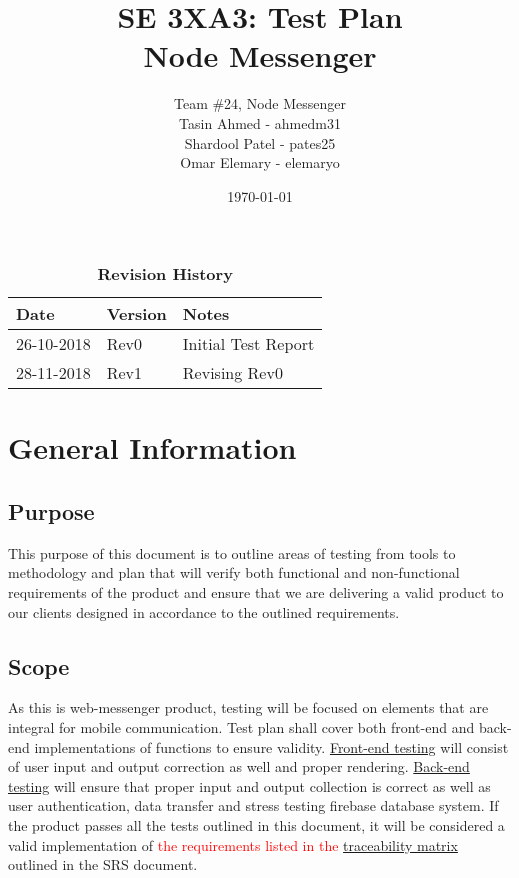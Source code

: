 \documentclass[12pt, titlepage]{article}
\title{SE 3XA3: Test Plan\\Node Messenger}
\author{Team \#24, Node Messenger
		\\ Tasin Ahmed - ahmedm31
		\\ Shardool Patel - pates25
		\\ Omar Elemary - elemaryo
}
\date{\today}
\begin{document}
\maketitle

\tableofcontents
\listoftables
\listoffigures

\begin{table}[bp]
\caption{\bf Revision History}
\begin{tabularx}{\textwidth}{p{3cm}p{2cm}X}
\toprule {\bf Date} & {\bf Version} & {\bf Notes}\\
\midrule
26-10-2018 & Rev0 & Initial Test Report\\
28-11-2018 & Rev1 & Revising Rev0\\
\bottomrule
\end{tabularx}
\end{table}

\newpage


\section{General Information}


\subsection{Purpose}
This purpose of this document is to outline areas of testing from tools to methodology and plan that will verify both functional and non-functional requirements of the product and ensure that we are delivering a valid product to our clients designed in accordance to the outlined requirements.
\subsection{Scope}
As this is web-messenger product, testing will be focused on elements that are integral for mobile communication. Test plan shall cover both front-end and back-end implementations of functions to ensure validity. \hyperref[sec:frontendtests]{Front-end testing} will consist of user input and output correction as well and proper rendering. \hyperref[sec:backendtests]{Back-end testing} will ensure that proper input and output collection is correct as well as user authentication, data transfer and stress testing firebase database system. If the product passes all the tests outlined in this document, it will be considered a valid implementation of \textcolor{red}{the requirements listed in the \hyperref[sec:tmatrix]{traceability matrix}} outlined in the SRS document. 
\end{document}
